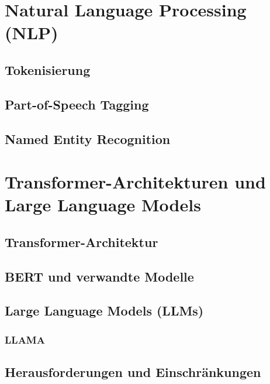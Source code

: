 \section{Natural Language Processing (NLP)}
\label{sec:nlp}

\subsection{Tokenisierung}
\label{subsec:tokenisierung}

\subsection{Part-of-Speech Tagging}
\label{subsec:pos-tagging}

\subsection{Named Entity Recognition}
\label{subsec:ner}

\section{Transformer-Architekturen und Large Language Models}
\label{sec:transformers-llms}

\subsection{Transformer-Architektur}
\label{subsec:transformer-architecture}

\subsection{BERT und verwandte Modelle}
\label{subsec:bert}

\subsection{Large Language Models (LLMs)}
\label{subsec:llms}

\subsubsection{LLAMA}
\label{subsubsec:LLAMA}

\subsection{Herausforderungen und Einschränkungen}
\label{subsec:llm-challenges}

